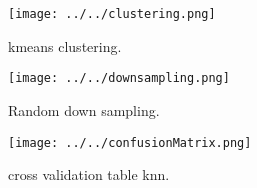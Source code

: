 \documentclass[paper=a4, fontsize=11pt]{scrartcl} %
\begin{document}
\begin{figure}[h]
	\centering
	\texttt{[image: ../../clustering.png]}
	\caption{kmeans clustering.}
	\label{fig:scree}
\end{figure}

\begin{figure}[h]
	\centering
	\texttt{[image: ../../downsampling.png]}
	\caption{Random down sampling.}
	\label{fig:scree}
\end{figure}
\begin{figure}[h]
	\centering
	\texttt{[image: ../../confusionMatrix.png]}
	\caption{cross validation table knn.}
	\label{fig:scree}
\end{figure}








\begin{flushleft}
\end{flushleft}

\begin{flushleft}
\end{flushleft}
\end{document}
